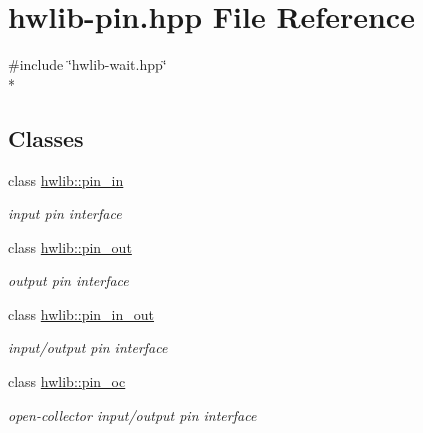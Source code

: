 \hypertarget{hwlib-pin_8hpp}{}\section{hwlib-\/pin.hpp File Reference}
\label{hwlib-pin_8hpp}
{\ttfamily \#include \char`\"{}hwlib-\/wait.\+hpp\char`\"{}}\\*
\subsection*{Classes}
\begin{DoxyCompactItemize}
\item 
class \hyperlink{classhwlib_1_1pin__in}{hwlib\+::pin\+\_\+in}
\begin{DoxyCompactList}\small\item\em input pin interface \end{DoxyCompactList}\item 
class \hyperlink{classhwlib_1_1pin__out}{hwlib\+::pin\+\_\+out}
\begin{DoxyCompactList}\small\item\em output pin interface \end{DoxyCompactList}\item 
class \hyperlink{classhwlib_1_1pin__in__out}{hwlib\+::pin\+\_\+in\+\_\+out}
\begin{DoxyCompactList}\small\item\em input/output pin interface \end{DoxyCompactList}\item 
class \hyperlink{classhwlib_1_1pin__oc}{hwlib\+::pin\+\_\+oc}
\begin{DoxyCompactList}\small\item\em open-\/collector input/output pin interface \end{DoxyCompactList}\end{DoxyCompactItemize}
